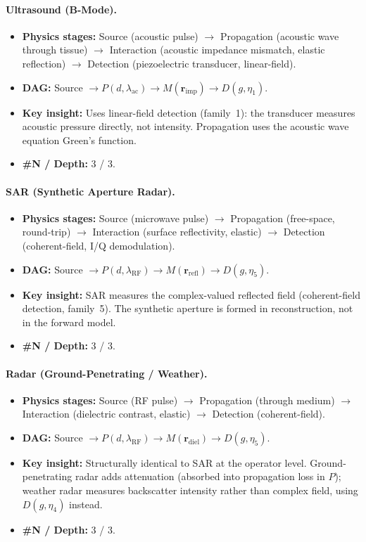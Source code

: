 \paragraph{Ultrasound (B-Mode).}
\begin{itemize}
  \item \textbf{Physics stages:} Source (acoustic pulse) $\to$ Propagation (acoustic wave through tissue) $\to$ Interaction (acoustic impedance mismatch, elastic reflection) $\to$ Detection (piezoelectric transducer, linear-field).
  \item \textbf{DAG:} Source $\to P(d, \lambda_{\mathrm{ac}}) \to M(\mathbf{r}_{\mathrm{imp}}) \to D(g, \eta_1)$.
  \item \textbf{Key insight:} Uses linear-field detection (family~1): the transducer measures acoustic pressure directly, not intensity. Propagation uses the acoustic wave equation Green's function.
  \item \textbf{\#N / Depth:} 3 / 3.
\end{itemize}

\paragraph{SAR (Synthetic Aperture Radar).}
\begin{itemize}
  \item \textbf{Physics stages:} Source (microwave pulse) $\to$ Propagation (free-space, round-trip) $\to$ Interaction (surface reflectivity, elastic) $\to$ Detection (coherent-field, I/Q demodulation).
  \item \textbf{DAG:} Source $\to P(d, \lambda_{\mathrm{RF}}) \to M(\mathbf{r}_{\mathrm{refl}}) \to D(g, \eta_5)$.
  \item \textbf{Key insight:} SAR measures the complex-valued reflected field (coherent-field detection, family~5). The synthetic aperture is formed in reconstruction, not in the forward model.
  \item \textbf{\#N / Depth:} 3 / 3.
\end{itemize}

\paragraph{Radar (Ground-Penetrating / Weather).}
\begin{itemize}
  \item \textbf{Physics stages:} Source (RF pulse) $\to$ Propagation (through medium) $\to$ Interaction (dielectric contrast, elastic) $\to$ Detection (coherent-field).
  \item \textbf{DAG:} Source $\to P(d, \lambda_{\mathrm{RF}}) \to M(\mathbf{r}_{\mathrm{diel}}) \to D(g, \eta_5)$.
  \item \textbf{Key insight:} Structurally identical to SAR at the operator level. Ground-penetrating radar adds attenuation (absorbed into propagation loss in $P$); weather radar measures backscatter intensity rather than complex field, using $D(g, \eta_4)$ instead.
  \item \textbf{\#N / Depth:} 3 / 3.
\end{itemize}

